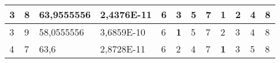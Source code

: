 \documentclass[conference]{IEEEtran}
\begin{document}
\begin{table*}[]
\begin{tabular}{|llll|llllllll|}
\multicolumn{1}{|l|}{3}                                                     & \multicolumn{1}{l|}{8}                                                        & \multicolumn{1}{l|}{63,9555556}                                                   & 2,4376E-11                     & \multicolumn{1}{l|}{6}                                                  & \multicolumn{1}{l|}{3}                                                  & \multicolumn{1}{l|}{5}                                                  & \multicolumn{1}{l|}{7}                                                  & \multicolumn{1}{l|}{\textbf{1}}                                         & \multicolumn{1}{l|}{2}                                                  & \multicolumn{1}{l|}{4}                                                  & 8                          \\ \hline
\multicolumn{1}{|l|}{3}                                                     & \multicolumn{1}{l|}{9}                                                        & \multicolumn{1}{l|}{58,0555556}                                                   & 3,6859E-10                     & \multicolumn{1}{l|}{6}                                                  & \multicolumn{1}{l|}{\textbf{1}}                                         & \multicolumn{1}{l|}{5}                                                  & \multicolumn{1}{l|}{7}                                                  & \multicolumn{1}{l|}{2}                                                  & \multicolumn{1}{l|}{3}                                                  & \multicolumn{1}{l|}{4}                                                  & 8                          \\ \hline
\multicolumn{1}{|l|}{4}                                                     & \multicolumn{1}{l|}{7}                                                        & \multicolumn{1}{l|}{63,6}                                                         & 2,8728E-11                     & \multicolumn{1}{l|}{6}                                                  & \multicolumn{1}{l|}{2}                                                  & \multicolumn{1}{l|}{4}                                                  & \multicolumn{1}{l|}{7}                                                  & \multicolumn{1}{l|}{\textbf{1}}                                         & \multicolumn{1}{l|}{3}                                                  & \multicolumn{1}{l|}{5}                                                  & 8                          \\ \hline

\end{tabular}
\end{table*}
\end{document}
